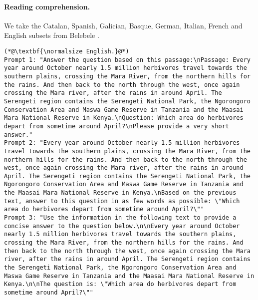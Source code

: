 \paragraph{Reading comprehension.} We take the Catalan, Spanish, Galician, Basque, German, Italian, French and English subsets from Belebele \citep{bandarkar-etal-2024-belebele}.

\begin{lstlisting}[label=lst:judge_readcompr_instances,caption={Example of prompts for reading comprehension in English and Basque.}]
(*@\textbf{\normalsize English.}@*)
Prompt 1: "Answer the question based on this passage:\nPassage: Every year around October nearly 1.5 million herbivores travel towards the southern plains, crossing the Mara River, from the northern hills for the rains. And then back to the north through the west, once again crossing the Mara river, after the rains in around April. The Serengeti region contains the Serengeti National Park, the Ngorongoro Conservation Area and Maswa Game Reserve in Tanzania and the Maasai Mara National Reserve in Kenya.\nQuestion: Which area do herbivores depart from sometime around April?\nPlease provide a very short answer."
Prompt 2: "Every year around October nearly 1.5 million herbivores travel towards the southern plains, crossing the Mara River, from the northern hills for the rains. And then back to the north through the west, once again crossing the Mara river, after the rains in around April. The Serengeti region contains the Serengeti National Park, the Ngorongoro Conservation Area and Maswa Game Reserve in Tanzania and the Maasai Mara National Reserve in Kenya.\nBased on the previous text, answer to this question in as few words as possible: \"Which area do herbivores depart from sometime around April?\""
Prompt 3: "Use the information in the following text to provide a concise answer to the question below.\n\nEvery year around October nearly 1.5 million herbivores travel towards the southern plains, crossing the Mara River, from the northern hills for the rains. And then back to the north through the west, once again crossing the Mara river, after the rains in around April. The Serengeti region contains the Serengeti National Park, the Ngorongoro Conservation Area and Maswa Game Reserve in Tanzania and the Maasai Mara National Reserve in Kenya.\n\nThe question is: \"Which area do herbivores depart from sometime around April?\""


\end{lstlisting}
